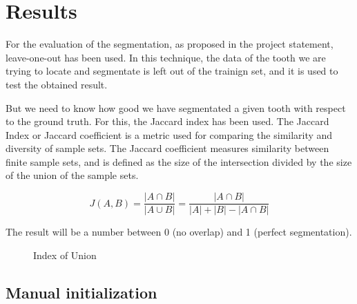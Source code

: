 \section{Results}

For the evaluation of the segmentation, as proposed in the
project statement, leave-one-out has been used. In this technique,
the data of the tooth we are trying to locate and segmentate is left
out of the trainign set, and it is used to test the obtained result.

But we need to know how good we have segmentated a given tooth with
respect to the ground truth. For this, the Jaccard index has been used.
The Jaccard Index or Jaccard coefficient is a metric used for
comparing the similarity and diversity of
sample sets. The Jaccard coefficient measures similarity between
finite sample sets, and is defined as the size of the intersection
divided by the size of the union of the sample sets.

$$ J(A,B) =  \frac{|A \cap B|}{|A \cup B|} = \frac{|A \cap B|}{|A| + |B| - |A \cap B|} $$

The result will be a number between 0 (no overlap) and
1 (perfect segmentation).

 \begin{figure} \centering
  \caption{Index of Union}
\end{figure}

\subsection{Manual initialization}


